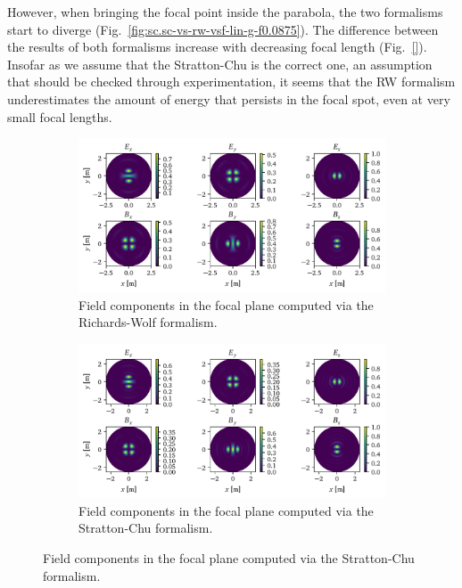 \documentclass[11pt,SymmetricalJury]{inrsthesis/inrsthesis}
\begin{document}
However, when bringing the focal point inside the parabola, the two formalisms
start to diverge (Fig.~\ref{fig:sc.sc-vs-rw-vsf-lin-g-f0.0875}). The difference
between the results of both formalisms increase with decreasing focal length
(Fig.~\ref{}). Insofar as we assume that the Stratton-Chu is the correct one, an
assumption that should be checked through experimentation, it seems that the RW
formalism underestimates the amount of energy that persists in the focal spot,
even at very small focal lengths.

\begin{figure}
  \begin{subfigure}{\textwidth}
    \centering
    \includegraphics[width=\textwidth]{figs//RichardsWolf_fpVSF.pdf}
    \caption[Richards-Wolf field components for the VSF.LIN.G.f0.00875 case.]
            {Field components in the focal plane computed via the Richards-Wolf
            formalism.}
    \label{fig:sc.rw.vsf-lin-g-na1}
  \end{subfigure}

  \begin{subfigure}{\textwidth}
    \centering
    \includegraphics[width=\textwidth]{figs/StrattonChu_fpVSF.pdf}
    \caption[Stratton-Chu field components for the VSF.LIN.G.f0.00875 case.]
            {Field components in the focal plane computed via the Stratton-Chu
            formalism.}
   \label{fig:sc.sc.vsf-lin-g-f0.0875}
  \end{subfigure}


\end{figure}
\end{document}
